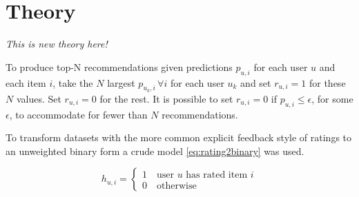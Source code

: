 \chapter{Theory}\label{cha:theory}

\textit{This is new theory here!}


To produce top-N recommendations given predictions $p_{u, i}$ for each user $u$ and each item $i$, take the $N$ largest $p_{u_k, i} \, \forall i$ for each user $u_k$ and set $r_{u, i} = 1$ for these $N$ values. Set $r_{u, i} = 0$ for the rest. It is possible to set $r_{u, i} = 0$ if $p_{u, i} \leq \epsilon$, for some $\epsilon$, to accommodate for fewer than $N$ recommendations.

To transform datasets with the more common explicit feedback style of ratings to an unweighted binary form a crude model \eqref{eq:rating2binary} was used.

\begin{equation} \label{eq:rating2binary}
    h_{u, i} = \begin{cases}
        1 \quad \text{user $u$ has rated item $i$} \\
        0 \quad \text{otherwise}
    \end{cases}
\end{equation}

